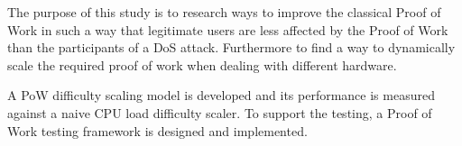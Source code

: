 The purpose of this study is to research ways to improve the classical Proof of Work in such a way that legitimate users are less affected by the Proof of Work than the participants of a DoS attack. Furthermore to find a way to dynamically scale the required proof of work when dealing with different hardware.

A PoW difficulty scaling model is developed and its performance is measured against a naive CPU load difficulty scaler. To support the testing, a Proof of Work testing framework is designed and implemented.%